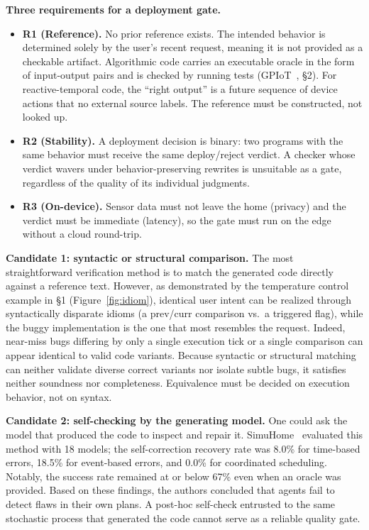 \documentclass[sigconf,nonacm,anonymous,review]{acmart}
\begin{document}
\textbf{Three requirements for a deployment gate.}
\begin{itemize}
\item \textbf{R1 (Reference).} No prior reference exists. The intended behavior is determined solely by the user’s recent request, meaning it is not provided as a checkable artifact.
Algorithmic code carries an executable oracle in the form of input-output pairs and is checked by running tests (GPIoT~\cite{gpiot}, \S2). For reactive-temporal code, the ``right output'' is a future sequence of device actions that no external source labels. The reference must be constructed, not looked up.
\item \textbf{R2 (Stability).} A deployment decision is binary: two programs with the same behavior must receive the same deploy/reject verdict. A checker whose verdict wavers under behavior-preserving rewrites is unsuitable as a gate, regardless of the quality of its individual judgments.
\item \textbf{R3 (On-device).} Sensor data must not leave the home (privacy) and the verdict must be immediate (latency), so the gate must run on the edge without a cloud round-trip.
\end{itemize}

\textbf{Candidate 1: syntactic or structural comparison.} The most straightforward verification method is to match the generated code directly against a reference text. However, as demonstrated by the temperature control example in \S1 (Figure~\ref{fig:idiom}), identical user intent can be realized through syntactically disparate idioms (a prev/curr comparison vs.\ a triggered flag), while the buggy implementation is the one that most resembles the request. Indeed, near-miss bugs differing by only a single execution tick or a single comparison can appear identical to valid code variants. Because syntactic or structural matching can neither validate diverse correct variants nor isolate subtle bugs, it satisfies neither soundness nor completeness.
Equivalence must be decided on execution behavior, not on syntax.

\textbf{Candidate 2: self-checking by the generating model.} One could ask the model that produced the code to inspect and repair it. SimuHome~\cite{simuhome} evaluated this method with 18 models; the self-correction recovery rate was 8.0\% for time-based errors, 18.5\% for event-based errors, and 0.0\% for coordinated scheduling. Notably, the success rate remained at or below 67\% even when an oracle was provided. Based on these findings, the authors concluded that agents fail to detect flaws in their own plans. A post-hoc self-check entrusted to the same stochastic process that generated the code cannot serve as a reliable quality gate.
\end{document}
